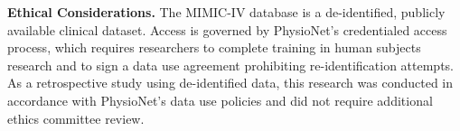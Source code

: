 \documentclass[english]{sbc2025}
\begin{document}
\begin{declarations}
\begin{furtherinformation}
\textbf{Ethical Considerations.} The MIMIC-IV database is a de-identified, publicly available clinical dataset. Access is governed by PhysioNet's credentialed access process, which requires researchers to complete training in human subjects research and to sign a data use agreement prohibiting re-identification attempts. As a retrospective study using de-identified data, this research was conducted in accordance with PhysioNet's data use policies and did not require additional ethics committee review.

\end{furtherinformation}

\end{declarations}



\balance

\end{document}
